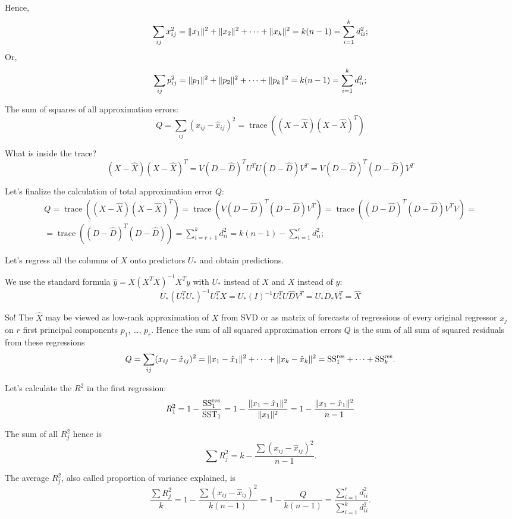 \documentclass[12pt]{article}
\DeclareMathOperator{\trace}{trace}
\DeclarePairedDelimiter{\norm}{\lVert}{\rVert}
\newcommand{\SSR}{\mathrm{SS}^{\text{res}}}
\newcommand{\SST}{\mathrm{SST}}
\begin{document}
Hence,
\[
\sum_{ij} x_{ij}^2 = \norm{x_1}^2 + \norm{x_2}^2 + \dots + \norm{x_k}^2 = k (n-1) = \sum_{i=1}^k d_{ii}^2;
\]
Or, 
\[
\sum_{ij} p_{ij}^2 = \norm{p_1}^2 + \norm{p_2}^2 + \dots + \norm{p_k}^2 = k (n-1) = \sum_{i=1}^k d_{ii}^2;
\]


The sum of squares of all approximation errors:
\[
Q = \sum_{ij} (x_{ij} - \hat x_{ij})^2 = \trace((X - \hat X)(X - \hat X)^T)
\]

What is inside the trace?
\[
(X - \hat X)(X - \hat X)^T = V(D - \hat D)^T U^T U(D - \hat D) V^T= V(D - \hat D)^T (D - \hat D) V^T
\]

Let's finalize the calculation of total approximation error $Q$:
\begin{multline*}
Q = \trace((X - \hat X)(X - \hat X)^T) = \trace(V(D - \hat D)^T (D - \hat D) V^T) = \trace((D - \hat D)^T (D - \hat D) V^TV) = \\
 = \trace((D - \hat D)^T (D - \hat D)) = \sum_{i=r+1}^{k} d_{ii}^2 = k (n-1) - \sum_{i=1}^r d_{ii}^2;
\end{multline*}


Let's regress all the columns of $X$ onto predictors $U_*$ and obtain predictions.

We use the standard formula $\hat y = X (X^T X)^{-1}X^T y$ with $U_*$ instead of $X$ and $X$ instead of $y$:
\[
    U_* (U_*^T U_*)^{-1} U_*^T X = U_* (I)^{-1} U_*^T U \hat D V^T = U_* D_* V_*^T = \hat X
\]

So! The $\hat X$ may be viewed as low-rank approximation of $X$ from SVD or as matrix of forecasts of regressions of every original regressor $x_j$ on $r$ first principal components $p_1$, \dots, $p_r$.
Hence the sum of all squared approximation errors $Q$ is the sum of all sum of squared residuals from these regressions
\[
Q = \sum_{ij} (x_{ij} - \hat x_{ij})^2 = \norm{x_1 - \hat x_1}^2 + \dots + \norm{x_k - \hat x_k}^2 = \SSR_1 + \dots + \SSR_k.
\]

Let's calculate the $R^2$ in the first regression:
\[
R^2_1 = 1 - \frac{\SSR_1 }{ \SST_1} = 1 - \frac{\norm{x_1 - \hat x_1}^2 }{ \norm{x_1}^2}= 1 - \frac{\norm{x_1 - \hat x_1}^2 }{ n - 1}
\]

The sum of all $R^2_j$ hence is
\[
\sum R_j^2 = k - \frac{\sum (x_{ij} - \hat x_{ij})^2}{n - 1}.
\]

The average $R^2_j$, also called proportion of variance explained, is
\[
\frac{\sum R_j^2}{k} = 1 - \frac{\sum (x_{ij} - \hat x_{ij})^2}{k(n - 1)} = 1 - \frac{Q}{k(n-1)} = \frac{\sum_{i=1}^r d_{ii}^2}{\sum_{i=1}^k d_{ii}^2}.
\]
\end{document}
